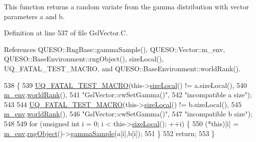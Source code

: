 This function returns a random variate from the gamma distribution with vector parameters a and b. 



Definition at line 537 of file Gsl\-Vector.\-C.



References Q\-U\-E\-S\-O\-::\-Rng\-Base\-::gamma\-Sample(), Q\-U\-E\-S\-O\-::\-Vector\-::m\-\_\-env, Q\-U\-E\-S\-O\-::\-Base\-Environment\-::rng\-Object(), size\-Local(), U\-Q\-\_\-\-F\-A\-T\-A\-L\-\_\-\-T\-E\-S\-T\-\_\-\-M\-A\-C\-R\-O, and Q\-U\-E\-S\-O\-::\-Base\-Environment\-::world\-Rank().


\begin{DoxyCode}
538 \{
539   \hyperlink{_defines_8h_a56d63d18d0a6d45757de47fcc06f574d}{UQ\_FATAL\_TEST\_MACRO}(this->\hyperlink{class_q_u_e_s_o_1_1_gsl_vector_ace6fb1739b7cf6456b3dcde84c766fb3}{sizeLocal}() != a.sizeLocal(),
540                       \hyperlink{class_q_u_e_s_o_1_1_vector_ae7615172bb1e54339151d3f3d71a0344}{m\_env}.\hyperlink{class_q_u_e_s_o_1_1_base_environment_a78b57112bbd0e6dd0e8afec00b40ffa7}{worldRank}(),
541                       \textcolor{stringliteral}{"GslVector::cwSetGamma()"},
542                       \textcolor{stringliteral}{"incompatible a size"});
543 
544   \hyperlink{_defines_8h_a56d63d18d0a6d45757de47fcc06f574d}{UQ\_FATAL\_TEST\_MACRO}(this->\hyperlink{class_q_u_e_s_o_1_1_gsl_vector_ace6fb1739b7cf6456b3dcde84c766fb3}{sizeLocal}() != b.sizeLocal(),
545                       \hyperlink{class_q_u_e_s_o_1_1_vector_ae7615172bb1e54339151d3f3d71a0344}{m\_env}.\hyperlink{class_q_u_e_s_o_1_1_base_environment_a78b57112bbd0e6dd0e8afec00b40ffa7}{worldRank}(),
546                       \textcolor{stringliteral}{"GslVector::cwSetGamma()"},
547                       \textcolor{stringliteral}{"incompatible b size"});
548 
549   \textcolor{keywordflow}{for} (\textcolor{keywordtype}{unsigned} \textcolor{keywordtype}{int} i = 0; i < this->\hyperlink{class_q_u_e_s_o_1_1_gsl_vector_ace6fb1739b7cf6456b3dcde84c766fb3}{sizeLocal}(); ++i) \{
550     (*this)[i] = \hyperlink{class_q_u_e_s_o_1_1_vector_ae7615172bb1e54339151d3f3d71a0344}{m\_env}.\hyperlink{class_q_u_e_s_o_1_1_base_environment_afc1f1258b770ac8e27cf308bbcd6a296}{rngObject}()->\hyperlink{class_q_u_e_s_o_1_1_rng_base_abd9abcf42426b568d4f13f5c3f3dc997}{gammaSample}(a[i],b[i]);
551   \}
552   \textcolor{keywordflow}{return};
553 \}
\end{DoxyCode}
